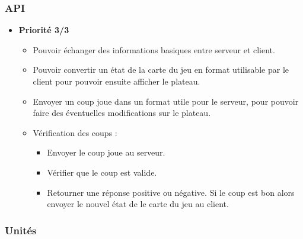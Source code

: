 \subsubsection{API}
\begin{itemize}
    \item \textbf{Priorité 3/3}
    \begin{itemize}
        \item Pouvoir échanger des informations basiques entre serveur et client.\cmark
        \item Pouvoir convertir un état de la carte du jeu en format utilisable par le client pour pouvoir ensuite afficher le plateau.
        \item Envoyer un coup joue dans un format utile pour le serveur, pour pouvoir faire des éventuelles modifications sur le plateau.\cmark
        \item Vérification des coups :
        \begin{itemize}
            \item Envoyer le coup joue au serveur.\cmark
            \item Vérifier que le coup est valide.\cmark
            \item Retourner une réponse positive ou négative. Si le coup est bon alors envoyer le nouvel état de le carte du jeu au client.\cmark
        \end{itemize}
    \end{itemize}
\end{itemize}

\subsubsection{Unités}

